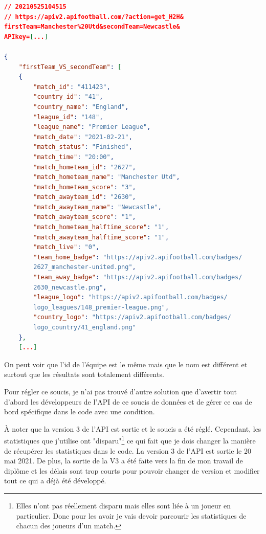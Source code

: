 \documentclass[a4paper,14pt]{extarticle}
\begin{document}
{\begin{lstlisting}[language=json, firstnumber=1, caption=Aperçu du JSON avec "Manchester United", captionpos=b, label=apercuJSONUnited2]
// 20210525104515
// https://apiv2.apifootball.com/?action=get_H2H&
firstTeam=Manchester%20Utd&secondTeam=Newcastle&
APIkey=[...]

{
    "firstTeam_VS_secondTeam": [
    {
        "match_id": "411423",
        "country_id": "41",
        "country_name": "England",
        "league_id": "148",
        "league_name": "Premier League",
        "match_date": "2021-02-21",
        "match_status": "Finished",
        "match_time": "20:00",
        "match_hometeam_id": "2627",
        "match_hometeam_name": "Manchester Utd",
        "match_hometeam_score": "3",
        "match_awayteam_id": "2630",
        "match_awayteam_name": "Newcastle",
        "match_awayteam_score": "1",
        "match_hometeam_halftime_score": "1",
        "match_awayteam_halftime_score": "1",
        "match_live": "0",
        "team_home_badge": "https://apiv2.apifootball.com/badges/
        2627_manchester-united.png",
        "team_away_badge": "https://apiv2.apifootball.com/badges/
        2630_newcastle.png",
        "league_logo": "https://apiv2.apifootball.com/badges/
        logo_leagues/148_premier-league.png",
        "country_logo": "https://apiv2.apifootball.com/badges/
        logo_country/41_england.png"
    },
    [...]
\end{lstlisting}

On peut voir que l'id de l'équipe est le même mais que le nom est différent et surtout que les résultats sont totalement différents.

Pour régler ce soucis, je n'ai pas trouvé d'autre solution que d'avertir tout d'abord les développeurs de l'API de ce soucis de données et de gérer ce cas de bord spécifique dans le code avec une condition.

À noter que la version 3 de l'API est sortie et le soucis a été réglé. Cependant, les statistiques que j'utilise ont "disparu"\footnote{Elles n'ont pas réellement disparu mais elles sont liée à un joueur en particulier. Donc pour les avoir je vais devoir parcourir les statistiques de chacun des joueurs d'un match.} ce qui fait que je dois changer la manière de récupérer les statistiques dans le code. La version 3 de l'API est sortie le 20 mai 2021. De plus, la sortie de la V3 a été faite vers la fin de mon travail de diplôme et les délais sont trop courts pour pouvoir changer de version et modifier tout ce qui a déjà été développé. 

}
\end{document}
